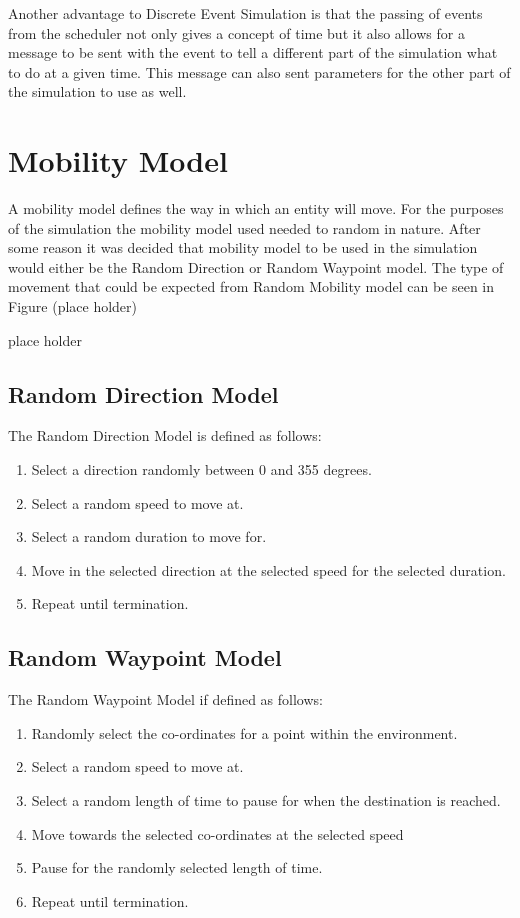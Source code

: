 Another advantage to Discrete Event Simulation is that the passing of events from the scheduler not only gives a concept of time but it also allows for a message to be sent with the event to tell a different part of the simulation what to do at a given time. This message can also sent parameters for the other part of the simulation to use as well.

\section{Mobility Model}\label{mobility}
A mobility model defines the way in which an entity will move. For the purposes of the simulation the mobility model used needed to random in nature. After some reason it was decided that mobility model to be used in the simulation would either be the Random Direction or Random Waypoint model. The type of movement that could be expected from Random Mobility model can be seen in Figure (place holder)

place holder
\subsection{Random Direction Model}
The Random Direction Model is defined as follows:
\begin{enumerate}
\item Select a direction randomly between 0 and 355 degrees.
\item Select a random speed to move at.
\item Select a random duration to move for.
\item Move in the selected direction at the selected speed for the selected duration.
\item Repeat until termination.
\end{enumerate}

\subsection{Random Waypoint Model}
The Random Waypoint Model if defined as follows:
\begin{enumerate}
\item Randomly select the co-ordinates for a point within the environment.
\item Select a random speed to move at.
\item Select a random length of time to pause for when the destination is reached.
\item Move towards the selected co-ordinates at the selected speed
\item Pause for the randomly selected length of time.
\item Repeat until termination.
\end{enumerate}


